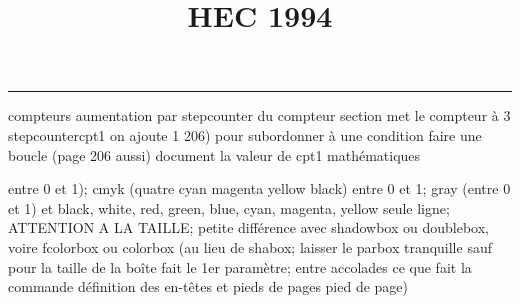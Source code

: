 \documentclass[11pt]{article}%
\title{\bf \vspace{-1cm} HEC 1994} %
\author{} %
\date{} %
\renewcommand{\headrulewidth}{0pt}%
\renewcommand{\footrulewidth}{0.4pt}%
\begin{document}
\maketitle %
\vspace{-1.2cm}\hrule %
\thispagestyle{fancy}

\vspace*{.4cm}


compteurs%
aumentation par stepcounter du compteur section%
met le compteur à 3%
stepcounter{cpt1} on ajoute 1%
206) pour subordonner à une condition %
faire une boucle (page 206 aussi) %
document la valeur de cpt1 
mathématiques\newcommand{\ch}{\operatorname{ch}} 
\newcommand{\sh}{\operatorname{sh}}
\renewcommand{\tanh}{\operatorname{th}}
\renewcommand{\sinh}{\operatorname{sh}}
\renewcommand{\cosh}{\operatorname{ch}}
\newcommand{\argsh}{\operatorname{argsh}}
\newcommand{\argch}{\operatorname{argch}}
\newcommand{\argth}{\operatorname{argth}}
\newcommand{\Id}{\operatorname{Id}}
\renewcommand{\leq}{\leq}
\renewcommand{\geq}{\geq }

\newcommand{\dlim}{\lim}
\newcommand{\dsum}{\sum}
\newcommand{\dprod}{\prod}



entre 0 et 1); cmyk (quatre cyan magenta yellow black) entre 0 et 1;
gray (entre 0 et 1) et black, white, red, green, blue, cyan, magenta,
yellow%
seule ligne; ATTENTION A LA TAILLE; petite différence avec shadowbox ou
doublebox, voire fcolorbox ou colorbox (au lieu de shabox; laisser le
parbox tranquille sauf pour la taille de la boîte
\newcommand{\Tbox}[1]{\begin{center} \shabox{\parbox{0.6
\linewidth}{#1}} \end{center}} %
fait le 1er paramètre; entre accolades ce que fait la commande
définition des en-têtes et pieds de pages\pagestyle{fancy}
\chead{}
\rfoot[ \ \thepage]{\thepage}
\cfoot{}
\lfoot{}
\thispagestyle{fancy} %
pied de page)\renewcommand{\footrulewidth}{0.4pt}
\renewcommand{\headrulewidth}{0.4pt}
\end{document}
